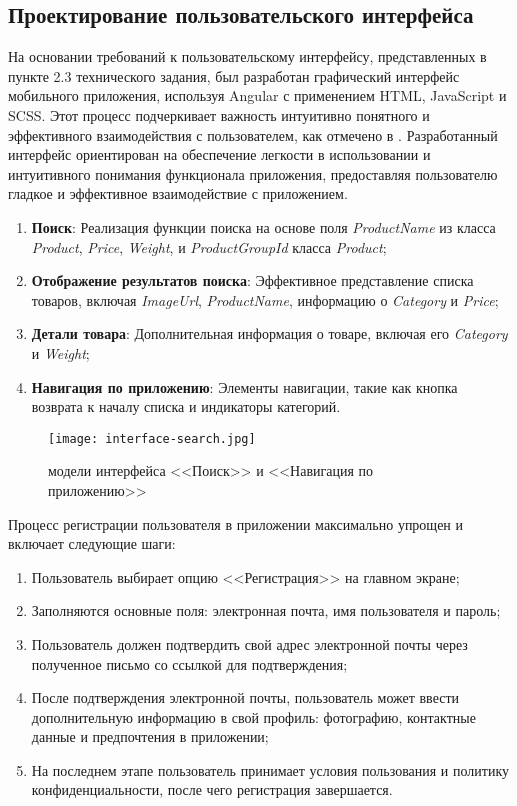 \subsection{Проектирование пользовательского интерфейса}

На основании требований к пользовательскому интерфейсу, представленных в пункте 2.3 технического задания, был разработан графический интерфейс мобильного приложения, используя Angular с применением HTML, JavaScript и SCSS. Этот процесс подчеркивает важность интуитивно понятного и эффективного взаимодействия с пользователем, как отмечено в \cite{kumskova}.
Разработанный интерфейс ориентирован на обеспечение легкости в использовании и интуитивного понимания функционала приложения, предоставляя пользователю гладкое и эффективное взаимодействие с приложением.

\begin{enumerate}
    \item \textbf{Поиск}: Реализация функции поиска на основе поля \textit{ProductName} из класса \textit{Product}, \textit{Price}, \textit{Weight}, и \textit{ProductGroupId} класса \textit{Product};
    \item \textbf{Отображение результатов поиска}: Эффективное представление списка товаров, включая \textit{ImageUrl}, \textit{ProductName}, информацию о \textit{Category} и \textit{Price};
    \item \textbf{Детали товара}: Дополнительная информация о товаре, включая его \textit{Category} и \textit{Weight};
    \item \textbf{Навигация по приложению}: Элементы навигации, такие как кнопка возврата к началу списка и индикаторы категорий.
\end{enumerate}

\begin{figure}[h!]
    \texttt{[image: interface-search.jpg]}
    \caption{модели интерфейса <<Поиск>> и <<Навигация по приложению>>}
    \label{fig:search}
\end{figure}

Процесс регистрации пользователя в приложении максимально упрощен и включает следующие шаги:
\begin{enumerate}
    \item Пользователь выбирает опцию <<Регистрация>> на главном экране;
    \item Заполняются основные поля: электронная почта, имя пользователя и пароль;
    \item Пользователь должен подтвердить свой адрес электронной почты через полученное письмо со ссылкой для подтверждения;
    \item После подтверждения электронной почты, пользователь может ввести дополнительную информацию в свой профиль: фотографию, контактные данные и предпочтения в приложении;
    \item На последнем этапе пользователь принимает условия пользования и политику конфиденциальности, после чего регистрация завершается.
\end{enumerate}

